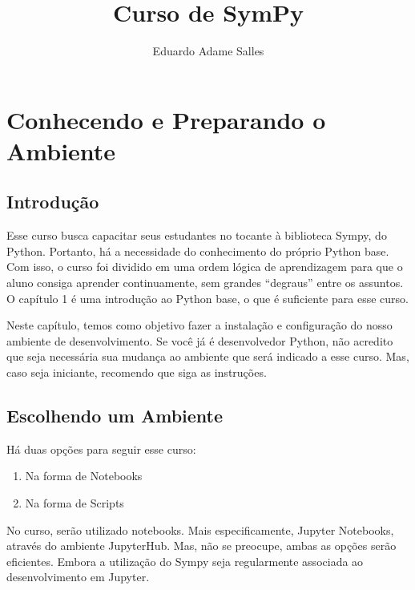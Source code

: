 \documentclass[11pt, brazilian]{article}
\title{Curso de SymPy}
\author{Eduardo Adame Salles}
\providecommand{\tightlist}{%
      \setlength{\itemsep}{0pt}\setlength{\parskip}{0pt}}
\begin{document}
    
    \maketitle
    \newpage
    \tableofcontents
    \newpage
    
    \hypertarget{conhecendo-e-preparando-o-ambiente}{%
\section{Conhecendo e Preparando o
Ambiente}\label{conhecendo-e-preparando-o-ambiente}}

\hypertarget{introduuxe7uxe3o}{%
\subsection{Introdução}\label{introduuxe7uxe3o}}

Esse curso busca capacitar seus estudantes no tocante à biblioteca
Sympy, do Python. Portanto, há a necessidade do conhecimento do próprio
Python base. Com isso, o curso foi dividido em uma ordem lógica de
aprendizagem para que o aluno consiga aprender continuamente, sem
grandes ``degraus'' entre os assuntos. O capítulo 1 é uma introdução ao
Python base, o que é suficiente para esse curso.

Neste capítulo, temos como objetivo fazer a instalação e configuração do
nosso ambiente de desenvolvimento. Se você já é desenvolvedor Python,
não acredito que seja necessária sua mudança ao ambiente que será
indicado a esse curso. Mas, caso seja iniciante, recomendo que siga as
instruções.

\hypertarget{escolhendo-um-ambiente}{%
\subsection{Escolhendo um Ambiente}\label{escolhendo-um-ambiente}}

Há duas opções para seguir esse curso:

\begin{enumerate}
\def\labelenumi{\arabic{enumi}.}
\tightlist
\item
  Na forma de Notebooks
\item
  Na forma de Scripts
\end{enumerate}

No curso, serão utilizado notebooks. Mais especificamente, Jupyter
Notebooks, através do ambiente JupyterHub. Mas, não se preocupe, ambas
as opções serão eficientes. Embora a utilização do Sympy seja
regularmente associada ao desenvolvimento em Jupyter.
\end{document}
